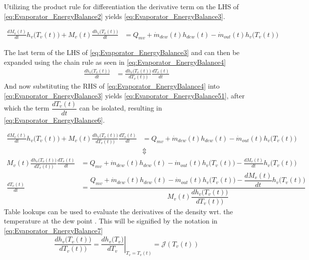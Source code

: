 Utilizing the product rule for differentiation the derivative term on the LHS of \cref{eq:Evaporator_EnergyBalance2} yields \cref{eq:Evaporator_EnergyBalance3}.


\begin{align}
	\frac{ dM_{v}(t)}{dt} h_v\bigl(T_v(t)\bigr) + M_{v}(t) \frac{ dh_v \bigl(T_v(t)\bigr)}{dt}  & = Q_{mv} + \dot{m}_{dew}(t)h_{dew}(t) - \dot{m}_{out}(t)h_v\bigl(T_{v}(t)\bigr)		\label{eq:Evaporator_EnergyBalance3}
\end{align}

The last term of the LHS of \cref{eq:Evaporator_EnergyBalance3} and can then be expanded using the chain rule as seen in \cref{eq:Evaporator_EnergyBalance4}
\begin{align}
	\frac{ dh_v \bigl(T_v(t)\bigr)}{dt}  & = \frac{ dh_v \bigl(T_{v}(t)\bigr)}{dT_v(t))} \frac{dT_v(t)}{dt}	\label{eq:Evaporator_EnergyBalance4}
\end{align}
And now substituting the RHS of \cref{eq:Evaporator_EnergyBalance4} into \cref{eq:Evaporator_EnergyBalance3} yields \cref{eq:Evaporator_EnergyBalance51}, after which the term $ \dfrac{dT_v(t)}{dt} $ can be isolated, resulting in \cref{eq:Evaporator_EnergyBalance6}.

\begin{align}
	\frac{dM_{v}(t)}{dt} h_v\bigl(T_v(t)\bigr) + M_{v}(t) \frac{ dh_v \bigl(T_v(t)\bigr)}{dT_v(t))} \frac{dT_v(t)}{dt}  & = Q_{mv} + \dot{m}_{dew}(t)h_{dew}(t) - \dot{m}_{out}(t)h_v\bigl(T_{v}(t)\bigr) \label{eq:Evaporator_EnergyBalance51}	\\
	& \Updownarrow \nonumber
\end{align}
\begin{align}
	 M_{v}(t) \frac{ dh_v \bigl(T_v(t)\bigr)}{dT_v(t))} \frac{dT_v(t)}{dt}  & = Q_{mv} + \dot{m}_{dew}(t)h_{dew}(t) - \dot{m}_{out}(t)h_v\bigl(T_{v}(t)\bigr) - \frac{dM_{v}(t)}{dt} h_v\bigl(T_v(t)\bigr)  \label{eq:Evaporator_EnergyBalance5} \\
	 \frac{dT_v(t)}{dt}  & = \dfrac{Q_{mv} + \dot{m}_{dew}(t)h_{dew}(t) - \dot{m}_{out}(t)h_v\bigl(T_{v}(t)\bigr) - \dfrac{dM_{v}(t)}{dt} h_v\bigl(T_v(t)\bigr)}{M_{v}(t) \dfrac{ dh_v \bigl(T_v(t)\bigr)}{dT_v(t))} }  \label{eq:Evaporator_EnergyBalance6}
\end{align}
Table lookups can be used to evaluate the derivatives of the density wrt. the temperature at the dew point . This will be signified by the notation in \cref{eq:Evaporator_EnergyBalance7}
\begin{equation}
	 \dfrac{ dh_v \bigl(T_v(t)\bigr)}{dT_v(t))} = \left. \dfrac{ dh_v \bigl(T_v\bigr)}{dT_v} \right |_{T_v = T_{v}(t)}= \mathcal{J}(T_v(t)) \label{eq:Evaporator_EnergyBalance7}
\end{equation}

